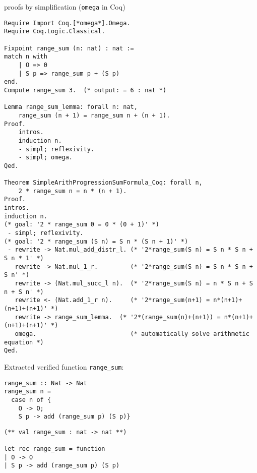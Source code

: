 \documentclass[article]{aaltoseries}
\begin{document}
proofs by simplification (\texttt{omega} in Coq)
 
\begin{lstlisting}[language=coq]
Require Import Coq.[*omega*].Omega.
Require Coq.Logic.Classical.

Fixpoint range_sum (n: nat) : nat :=
match n with
    | O => 0
    | S p => range_sum p + (S p)
end.
Compute range_sum 3.  (* output: = 6 : nat *)

Lemma range_sum_lemma: forall n: nat,
    range_sum (n + 1) = range_sum n + (n + 1).
Proof.
    intros.
    induction n.
    - simpl; reflexivity.
    - simpl; omega.
Qed.

Theorem SimpleArithProgressionSumFormula_Coq: forall n,
    2 * range_sum n = n * (n + 1).
Proof.
intros.
induction n.
(* goal: '2 * range_sum 0 = 0 * (0 + 1)' *)
 - simpl; reflexivity.
(* goal: '2 * range_sum (S n) = S n * (S n + 1)' *)
 - rewrite -> Nat.mul_add_distr_l. (* '2*range_sum(S n) = S n * S n + S n * 1' *)
   rewrite -> Nat.mul_1_r.         (* '2*range_sum(S n) = S n * S n + S n' *)
   rewrite -> (Nat.mul_succ_l n).  (* '2*range_sum(S n) = n * S n + S n + S n' *)
   rewrite <- (Nat.add_1_r n).     (* '2*range_sum(n+1) = n*(n+1)+(n+1)+(n+1)' *)
   rewrite -> range_sum_lemma.  (* '2*(range_sum(n)+(n+1)) = n*(n+1)+(n+1)+(n+1)' *)
   omega.                          (* automatically solve arithmetic equation *)
Qed.
\end{lstlisting}


Extracted verified function \texttt{range\_sum}:

\begin{minipage}{.45\columnwidth}
\begin{lstlisting}[caption={Extracted function in Haskell},frame=none]
range_sum :: Nat -> Nat
range_sum n =
  case n of {
    O -> O;
    S p -> add (range_sum p) (S p)}
\end{lstlisting}
\end{minipage}
\begin{minipage}{.45\columnwidth}
\begin{lstlisting}[caption={Extracted function in OCaml},frame=none]
(** val range_sum : nat -> nat **)

let rec range_sum = function
| O -> O
| S p -> add (range_sum p) (S p)
\end{lstlisting}
\end{minipage}
\end{document}
